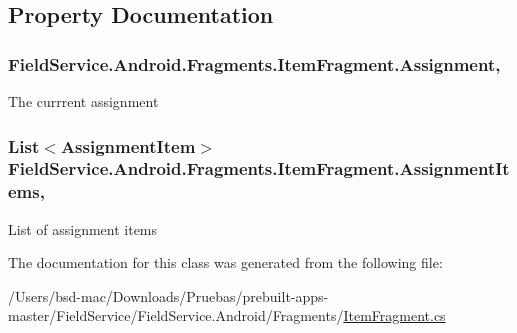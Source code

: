\subsection{Property Documentation}
\hypertarget{class_field_service_1_1_android_1_1_fragments_1_1_item_fragment_a1642dd7b67b41927651295ad4fc4ec54}{
\subsubsection[{Assignment}]{ Field\+Service.\+Android.\+Fragments.\+Item\+Fragment.\+Assignment\hspace{0.3cm}{\ttfamily [get]}, {\ttfamily [set]}}}\label{class_field_service_1_1_android_1_1_fragments_1_1_item_fragment_a1642dd7b67b41927651295ad4fc4ec54}


The currrent assignment 

\hypertarget{class_field_service_1_1_android_1_1_fragments_1_1_item_fragment_a7fb87c3e23b1ee6a3b241ca1a748b354}{
\subsubsection[{Assignment\+Items}]{\setlength{\rightskip}{0pt plus 5cm}List$<${\bf Assignment\+Item}$>$ Field\+Service.\+Android.\+Fragments.\+Item\+Fragment.\+Assignment\+Items\hspace{0.3cm}{\ttfamily [get]}, {\ttfamily [set]}}}\label{class_field_service_1_1_android_1_1_fragments_1_1_item_fragment_a7fb87c3e23b1ee6a3b241ca1a748b354}


List of assignment items 



The documentation for this class was generated from the following file\+:\begin{DoxyCompactItemize}
\item 
/\+Users/bsd-\/mac/\+Downloads/\+Pruebas/prebuilt-\/apps-\/master/\+Field\+Service/\+Field\+Service.\+Android/\+Fragments/\hyperlink{_item_fragment_8cs}{Item\+Fragment.\+cs}\end{DoxyCompactItemize}
